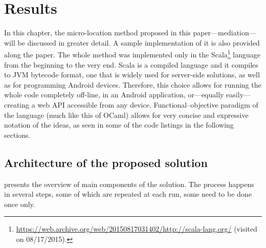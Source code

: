 \chapter{Results}
\label{cha:results}

In this chapter, the micro-location method proposed in this paper---mediation---will be discussed in greater detail. A sample implementation of it is also provided along the paper. The whole method was implemented only in the Scala\footnote{\url{https://web.archive.org/web/20150817031402/http://scala-lang.org/} (visited on 08/17/2015).} language from the beginning to the very end. Scala is a compiled language and it compiles to JVM bytecode format, one that is widely used for server-side solutions, as well as for programming Android devices. Therefore, this choice allows for running the whole code completely off-line, in an Android application, or---equally easily---creating a web API accessible from any device. Functional--objective paradigm of the language (much like this of OCaml) allows for very concise and expressive notation of the ideas, as seen in some of the code listings in the following sections.

\section{Architecture of the proposed solution}
\label{sec:architecture}

 presents the overview of main components of the solution. The process happens in several steps, some of which are repeated at each run, some need to be done once only.

